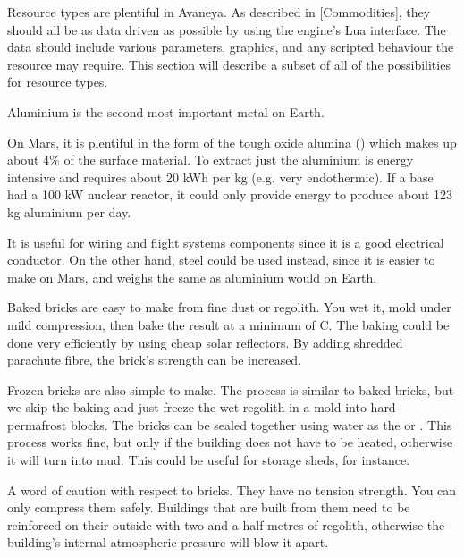 

Resource types are plentiful in Avaneya. As described in [Commodities], they should all be as data driven as possible by using the engine’s Lua interface. The data should include various parameters, graphics, and any scripted behaviour the resource may require. This section will describe a subset of all of the possibilities for resource types.

Aluminium is the second most important metal on Earth. 

On Mars, it is plentiful in the form of the tough oxide alumina () which makes up about 4\% of the surface material. To extract just the aluminium is energy intensive and requires about 20 kWh per kg (e.g. very endothermic). If a base had a 100 kW nuclear reactor, it could only provide energy to produce about 123 kg aluminium per day.

It is useful for wiring and flight systems components since it is a good electrical conductor. On the other hand, steel could be used instead, since it is easier to make on Mars, and weighs the same as aluminium would on Earth.

Baked bricks are easy to make from fine dust or regolith. You  wet it, mold under mild compression, then bake the result at a minimum of C. The baking could be done very efficiently by using cheap solar reflectors. By adding shredded parachute fibre, the brick's strength can be increased.

Frozen bricks are also simple to make. The process is similar to baked bricks, but we skip the baking and just freeze the wet regolith in a mold into hard permafrost blocks. The bricks can be sealed together using water as the  or . This process works fine, but only if the building does not have to be heated, otherwise it will turn into mud. This could be useful for storage sheds, for instance.

A word of caution with respect to bricks. They have no tension strength. You can only compress them safely. Buildings that are built from them need to be reinforced on their outside with two and a half metres of regolith, otherwise the building's internal atmospheric pressure will blow it apart.

